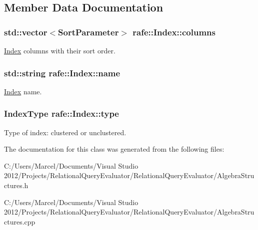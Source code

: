 \subsection{Member Data Documentation}
\hypertarget{classrafe_1_1_index_a74cf2aef59f22a7ef0175b59908bd3b2}{
\subsubsection[{columns}]{\setlength{\rightskip}{0pt plus 5cm}std\+::vector$<${\bf Sort\+Parameter}$>$ rafe\+::\+Index\+::columns}}\label{classrafe_1_1_index_a74cf2aef59f22a7ef0175b59908bd3b2}
\hyperlink{classrafe_1_1_index}{Index} columns with their sort order. \hypertarget{classrafe_1_1_index_adfba6ba7d75003d44df8b92d6e232346}{
\subsubsection[{name}]{\setlength{\rightskip}{0pt plus 5cm}std\+::string rafe\+::\+Index\+::name}}\label{classrafe_1_1_index_adfba6ba7d75003d44df8b92d6e232346}
\hyperlink{classrafe_1_1_index}{Index} name. \hypertarget{classrafe_1_1_index_ab51a314af4e6fcda600f72b2ca5a6851}{
\subsubsection[{type}]{\setlength{\rightskip}{0pt plus 5cm}Index\+Type rafe\+::\+Index\+::type}}\label{classrafe_1_1_index_ab51a314af4e6fcda600f72b2ca5a6851}
Type of index\+: clustered or unclustered. 

The documentation for this class was generated from the following files\+:\begin{DoxyCompactItemize}
\item 
C\+:/\+Users/\+Marcel/\+Documents/\+Visual Studio 2012/\+Projects/\+Relational\+Query\+Evaluator/\+Relational\+Query\+Evaluator/Algebra\+Structures.\+h\item 
C\+:/\+Users/\+Marcel/\+Documents/\+Visual Studio 2012/\+Projects/\+Relational\+Query\+Evaluator/\+Relational\+Query\+Evaluator/Algebra\+Structures.\+cpp\end{DoxyCompactItemize}
